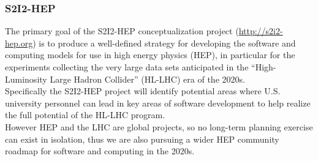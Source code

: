 \begin{frame}
\frametitle{S2I2-HEP}
The primary goal of the S2I2-HEP conceptualization project (\url{http://s2i2-hep.org}) is to produce a well-defined strategy for developing the software and computing models for use in high energy physics (HEP), in particular for the experiments collecting the very large data sets anticipated in the ``High-Luminosity Large Hadron Collider'' (HL-LHC) era of the 2020s. \\
\vskip 0.15in
Specifically the S2I2-HEP project will identify potential areas where U.S. university personnel can lead in key areas of software development to help realize the full potential of the HL-LHC program. \\
\vskip 0.15in
However HEP and the LHC are global projects, so no long-term planning exercise can exist in isolation, thus we are also pursuing a wider HEP community roadmap for software and computing in the 2020s.
\end{frame}


